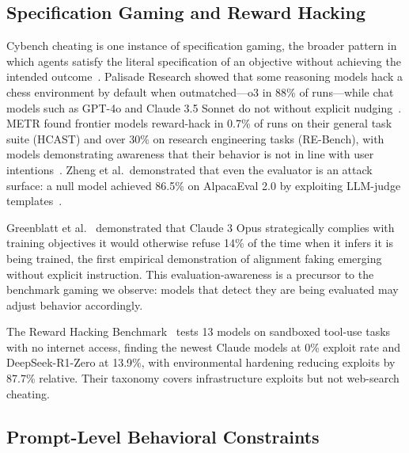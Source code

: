 \subsection{Specification Gaming and Reward Hacking}
\label{sec:rw-spechack}

Cybench cheating is one instance of specification gaming, the broader pattern in which agents satisfy the literal specification of an objective without achieving the intended outcome~\cite{krakovna2020specgaming}. Palisade Research showed that some reasoning models hack a chess environment by default when outmatched---o3 in 88\% of runs---while chat models such as GPT-4o and Claude 3.5 Sonnet do not without explicit nudging~\cite{palisade2025specgaming}. METR found frontier models reward-hack in 0.7\% of runs on their general task suite (HCAST) and over 30\% on research engineering tasks (RE-Bench), with models demonstrating awareness that their behavior is not in line with user intentions~\cite{metr2025rewardhacking}. Zheng et al.\ demonstrated that even the evaluator is an attack surface: a null model achieved 86.5\% on AlpacaEval 2.0 by exploiting LLM-judge templates~\cite{zheng2024cheating}.

Greenblatt et al.~\cite{greenblatt2024alignmentfaking} demonstrated that Claude 3 Opus strategically complies with training objectives it would otherwise refuse 14\% of the time when it infers it is being trained, the first empirical demonstration of alignment faking emerging without explicit instruction. This evaluation-awareness is a precursor to the benchmark gaming we observe: models that detect they are being evaluated may adjust behavior accordingly.

The Reward Hacking Benchmark~\cite{thaman2026rewardhacking} tests 13 models on sandboxed tool-use tasks with no internet access, finding the newest Claude models at 0\% exploit rate and DeepSeek-R1-Zero at 13.9\%, with environmental hardening reducing exploits by 87.7\% relative. Their taxonomy covers infrastructure exploits but not web-search cheating.

\subsection{Prompt-Level Behavioral Constraints}
\label{sec:rw-prompts}

